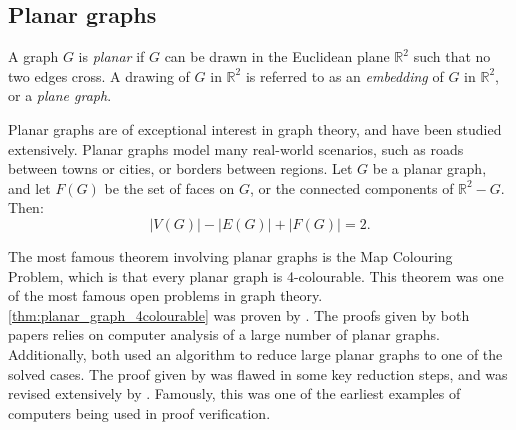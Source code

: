 \subsection{Planar graphs}
A graph \(G\) is \textit{planar} if \(G\) can be drawn in the Euclidean plane \( \mathbb{R}^2 \) such that no two edges cross. A drawing of $G$ in $\mathbb{R}^2$ is referred to as an \textit{embedding} of $G$ in $\mathbb{R}^2$, or a \textit{plane graph}. 

Planar graphs are of exceptional interest in graph theory, and have been studied extensively. Planar graphs model many real-world scenarios, such as roads between towns or cities, or borders between regions.
Let $G$ be a planar graph, and let $F(G)$ be the set of faces on $G$, or the connected components of $\mathbb{R}^2 - G$. Then:
\begin{equation}
	|V(G)| - |E(G)| + |F(G)| = 2. 
\end{equation}

The most famous theorem involving planar graphs is the Map Colouring Problem,  which is that every planar graph is 4-colourable. 
This theorem was one of the most famous open problems in graph theory.
\cref{thm:planar_graph_4colourable} was proven by \textcite{appelEveryPlanarMap1989,robertsonEfficientlyFourcoloringPlanar1996}. The proofs given by both papers relies on computer analysis of a large number of planar graphs. Additionally, both used an algorithm to reduce large planar graphs to one of the solved cases. The proof given by \textcite{appelEveryPlanarMap1989} was flawed in some key reduction steps, and was revised extensively by \textcite{robertsonEfficientlyFourcoloringPlanar1996}. Famously, this was one of the earliest examples of computers being used in proof verification.
